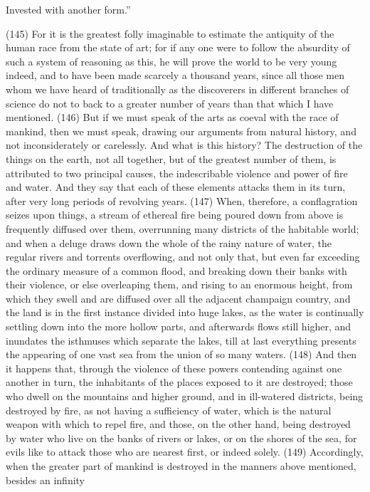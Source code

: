 Invested with another form.''

(145) For it is the greatest folly imaginable to estimate the antiquity of the human race from the
state of art; for if any one were to follow the absurdity of such a system of reasoning as this, he will
prove the world to be very young indeed, and to have been made scarcely a thousand years, since
all those men whom we have heard of traditionally as the discoverers in different branches of
science do not to back to a greater number of years than that which I have mentioned. (146) But if
we must speak of the arts as coeval with the race of mankind, then we must speak, drawing our
arguments from natural history, and not inconsiderately or carelessly. And what is this history? The
destruction of the things on the earth, not all together, but of the greatest number of them, is
attributed to two principal causes, the indescribable violence and power of fire and water. And they
say that each of these elements attacks them in its turn, after very long periods of revolving years.
(147) When, therefore, a conflagration seizes upon things, a stream of ethereal fire being poured
down from above is frequently diffused over them, overrunning many districts of the habitable
world; and when a deluge draws down the whole of the rainy nature of water, the regular rivers and
torrents overflowing, and not only that, but even far exceeding the ordinary measure of a common
flood, and breaking down their banks with their violence, or else overleaping them, and rising to an
enormous height, from which they swell and are diffused over all the adjacent champaign country,
and the land is in the first instance divided into huge lakes, as the water is continually settling down
into the more hollow parts, and afterwards flows still higher, and inundates the isthmuses which
separate the lakes, till at last everything presents the appearing of one vast sea from the union of
so many waters. (148) And then it happens that, through the violence of these powers contending
against one another in turn, the inhabitants of the places exposed to it are destroyed; those who
dwell on the mountains and higher ground, and in ill-watered districts, being destroyed by fire, as
not having a sufficiency of water, which is the natural weapon with which to repel fire, and those, on
the other hand, being destroyed by water who live on the banks of rivers or lakes, or on the shores
of the sea, for evils like to attack those who are nearest first, or indeed solely. (149) Accordingly,
when the greater part of mankind is destroyed in the manners above mentioned, besides an infinity
